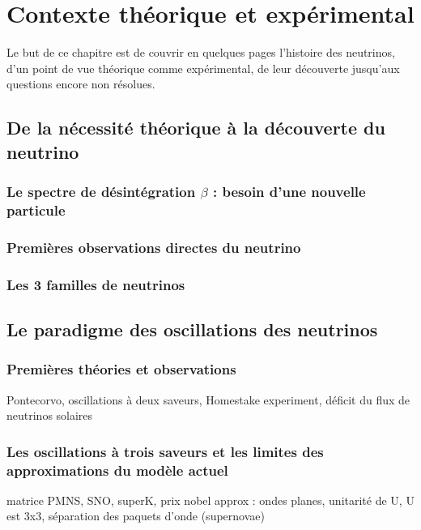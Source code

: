 \chapter{Contexte théorique et expérimental}
    
    Le but de ce chapitre est de couvrir en quelques pages l'histoire des neutrinos, d'un point de vue théorique comme expérimental, de leur découverte jusqu'aux questions encore non résolues.
    
    \section{De la nécessité théorique à la découverte du neutrino}
    
        \subsection{Le spectre de désintégration \texorpdfstring{$\beta$}{b} : besoin d'une nouvelle particule}
    
        \subsection{Premières observations directes du neutrino}
    
        \subsection{Les 3 familles de neutrinos}
    
    \section{Le paradigme des oscillations des neutrinos}
    
        \subsection{Premières théories et observations}
            Pontecorvo, oscillations à deux saveurs, Homestake experiment, déficit du flux de neutrinos solaires
        
        \subsection{Les oscillations à trois saveurs et les limites des approximations du modèle actuel}\label{sec::oscillations}
            \cite{Nunokawa2007}
            matrice PMNS, SNO, superK, prix nobel
            approx : ondes planes, unitarité de U, U est 3x3, séparation des paquets d'onde (supernovae)
        
